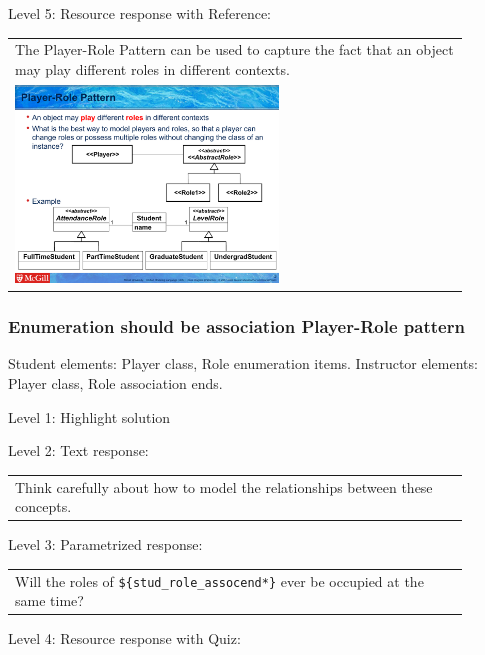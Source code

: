 \noindent Level 5: Resource response with Reference: \medskip

\begin{tabular}{|p{0.9\linewidth}}
The Player-Role Pattern can be used to capture the fact that an object may play different roles
in different contexts.

\\
\includegraphics[width=0.6\textwidth]{images/player_role.png}
\end{tabular} \medskip


\subsubsection{Enumeration should be association Player-Role pattern}

Student elements: Player class, Role enumeration items. Instructor elements: Player class, Role association ends. \medskip

\noindent Level 1: Highlight solution  \medskip

\noindent Level 2: Text response: \medskip

\begin{tabular}{|p{0.9\linewidth}}
Think carefully about how to model the relationships between these concepts.
\end{tabular} \medskip

\noindent Level 3: Parametrized response: \medskip

\begin{tabular}{|p{0.9\linewidth}}
Will the roles of \verb|${stud_role_assocend*}| ever be occupied at the same time?
\end{tabular} \medskip

\noindent Level 4: Resource response with Quiz: \medskip


